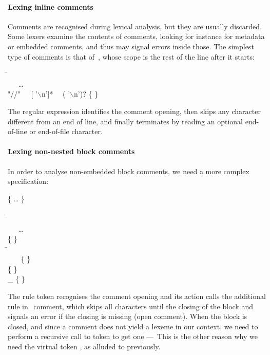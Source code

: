 \documentclass[12pt,a4paper]{article}
\begin{document}
\paragraph{Lexing inline comments}

Comments are recognised during lexical analysis, but they are usually
discarded. Some lexers examine the contents of comments, looking for
instance for metadata or embedded comments, and thus may signal errors
inside those. The simplest type of comments is that of~\Cpp{}, whose
scope is the rest of the line after it starts:
\begin{tabbing}
\Xrule \=  \equal \Xparse\\
\> \ \ \ \ldots\\
\> \vbar{} \textsf{"//"\ \ \ [ '\(\backslash\)n']*
  \ \ ( \vbar{} '\(\backslash\)n')?} \{   \}
\end{tabbing}
The regular expression identifies the comment opening, then skips any
character different from an end of line, and finally terminates by
reading an optional end\hyp{}of\hyp{}line or end\hyp{}of\hyp{}file
character.

\paragraph{Lexing non-nested block comments}

In order to analyse non\hyp{}embedded block comments, we need a more
complex specification:
\begin{tabbing}
\{ \ldots{} \Xexception {} \}\\
\\
\Xrule \=  \equal \Xparse\\
\> \ \ \ \ldots\\
\> \vbar{} \str{/*} \{   \}\\
\Xand \=  \equal \Xparse\\
\> \ \ \ \str{*/} \= \{   \}\\
\> \vbar{}  \> \{   \}\\
\> \vbar{} {\large \_} \> \{   \}
\end{tabbing}
The rule \textsf{token} recognises the comment opening and its action
calls the additional rule \textsf{in\_comment}, which skips all
characters until the closing of the block and signals an error if the
closing is missing (open comment). When the block is closed, and since
a comment does not yield a lexeme in our context, we need to perform a
recursive call to \textsf{token} to get one ---~This is the other
reason why we need the virtual token \Teof, as alluded to previously.
\end{document}
